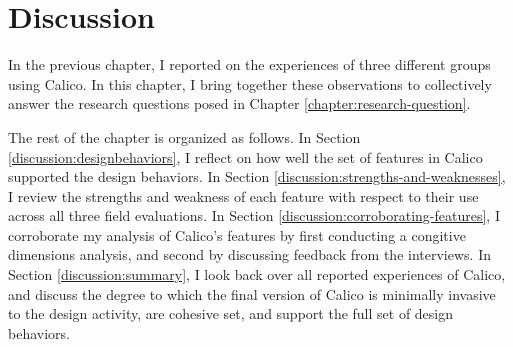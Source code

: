 \documentclass[12pt,fleqn]{ucithesis}
\begin{document}
%
%
%
 \newpage 
 \newpage \chapter{Discussion}
\label{chapter:discussion}

In the previous chapter, I reported on the experiences of three different groups using Calico. In this chapter, I bring together these observations to collectively answer the research questions posed in Chapter \ref{chapter:research-question}. 

The rest of the chapter is organized as follows. In Section \ref{discussion:designbehaviors}, I reflect on how well the set of features in Calico supported the design behaviors. In Section \ref{discussion:strengths-and-weaknesses}, I review the strengths and weakness of each feature with respect to their use across all three field evaluations. In Section \ref{discussion:corroborating-features}, I corroborate my analysis of Calico's features by first conducting a congitive dimensions analysis, and second by discussing feedback from the interviews. In Section \ref{discussion:summary}, I look back over all reported experiences of Calico, and discuss the degree to which the final version of Calico is minimally invasive to the design activity, are cohesive set, and support the full set of design behaviors.

\end{document}
